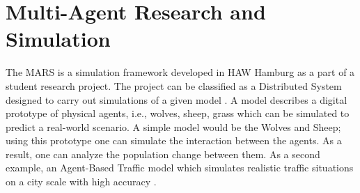 
\section{Multi-Agent Research and Simulation}
        \label{section:MARS}
        The MARS is a simulation framework developed 
        in HAW Hamburg as a part of a student research project. The project can be classified as a
        Distributed System \cite{DistributedSystems} designed to carry out simulations of a given model 
        \cite{HAWHamburgMARS}. 
        A model describes a digital prototype of physical agents, i.e., wolves, sheep, grass 
        which can be simulated to predict a real-world scenario. A simple model would
        be the Wolves and Sheep; using this prototype one can simulate the interaction between the agents. 
        As a result, one can analyze the population change between them. As a second example, an Agent-Based Traffic
        model which simulates realistic traffic situations on a city scale with high accuracy \cite{TrafficModel}.

        \par
